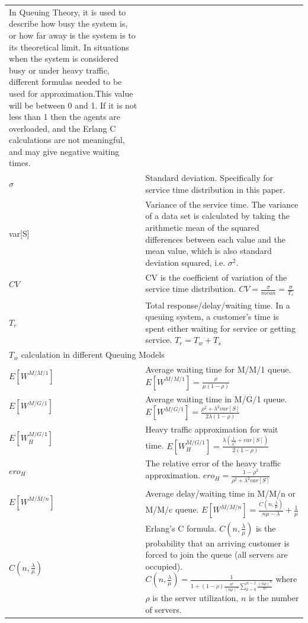 \begin{center}
\begin{longtable}{p{27mm} p{106mm}}
In Queuing Theory, it is used to describe how busy the system is, or how far away is the system is to its theoretical limit.  In situations when the system is considered busy or under heavy traffic, different formulas needed to be used for approximation.This value will be between 0 and 1. If it is not less than 1 then the agents are overloaded, and the Erlang C calculations are not meaningful, and may give negative waiting times.\\
$\sigma$    & Standard deviation. Specifically for service time distribution in this paper.  \\
var[S] & Variance of the service time. The variance of a data set is calculated by taking the arithmetic mean of the squared differences between each value and the mean value, which is also standard deviation squared, i.e. $\sigma^{2}$.\\
$CV$ & CV is the coefficient of variation of the service time distribution. $CV=\frac{\sigma}{mean}=\frac{\sigma}{T_{s}}$\\
$T_{r}$ & Total response/delay/waiting time. In a queuing system, a customer's time is spent either waiting for service or getting service. $T_{r}=T_{w}+T_{s}$\\
\hline
\multicolumn{2}{l}{$T_{w}$ calculation in different Queuing Models}\\
\hline
$E[W^{M/M/1}]$ & Average waiting time for M/M/1 queue. $E[W^{M/M/1}]= \frac{\rho}{ \mu(1-\rho) }$\\
$E[W^{M/G/1}]$ & Average waiting time in M/G/1 queue. $E[W^{M/G/1}]=\frac  {\rho ^{2}+\lambda ^{2} var[S]}{2\lambda (1-\rho )}$\\
\hline
$E[W_{H}^{M/G/1}]$ & Heavy traffic approximation for wait time. $E[W_{H}^{M/G/1}]=\frac{ \lambda (  \frac{1}{\lambda ^{2}} + var[S]) }{ 2(1-\rho ) }$ \\
$ero_{H}$ & The relative error of the heavy traffic approximation. $ero_{H}=\frac{ 1-\rho ^{2} }{ \rho ^{2}+\lambda ^{2} var[S] }$\\
\hline
$E[W^{M/M/n}]$	& Average delay/waiting time in M/M/n or M/M/c queue. $E[W^{M/M/n}] =\frac{ C(n,\frac{\lambda}{\mu}) }{n\mu-\lambda} + \frac{1}{\mu}$\\
$C(n,\frac{\lambda}{\mu})$ & Erlang's C formula. $C(n,\frac{\lambda}{\mu})$ is the probability that an arriving customer is forced to join the queue (all servers are occupied).$ C(n,\frac{\lambda}{\mu}) = \frac {1}{ 1+(1-\rho)\frac {n!}{ (n\rho )^{n} } \sum _{k=0}^{n-1}{\frac { (n\rho )^{n} }{ n! }} } $ where $\rho$ is the server utilization, $n$ is the number of servers.\\

\end{longtable}
\end{center}
